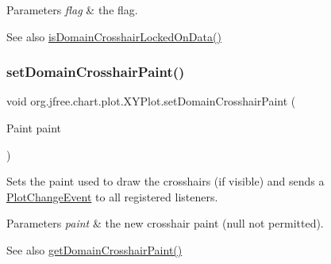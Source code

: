 \begin{DoxyParams}{Parameters}
{\em flag} & the flag.\\
\hline
\end{DoxyParams}
\begin{DoxySeeAlso}{See also}
\mbox{\hyperlink{classorg_1_1jfree_1_1chart_1_1plot_1_1_x_y_plot_adaa769a4f03f93f815c6f0be6f9d9435}{is\+Domain\+Crosshair\+Locked\+On\+Data()}} 
\end{DoxySeeAlso}
\mbox{\label{classorg_1_1jfree_1_1chart_1_1plot_1_1_x_y_plot_a7b47895577fbe1e7194037629f93b7e8}} 
\subsubsection{\texorpdfstring{set\+Domain\+Crosshair\+Paint()}{setDomainCrosshairPaint()}}
{\footnotesize\ttfamily void org.\+jfree.\+chart.\+plot.\+X\+Y\+Plot.\+set\+Domain\+Crosshair\+Paint (\begin{DoxyParamCaption}\item[{Paint}]{paint }\end{DoxyParamCaption})}

Sets the paint used to draw the crosshairs (if visible) and sends a \mbox{\hyperlink{}{Plot\+Change\+Event}} to all registered listeners.


\begin{DoxyParams}{Parameters}
{\em paint} & the new crosshair paint ({\ttfamily null} not permitted).\\
\hline
\end{DoxyParams}
\begin{DoxySeeAlso}{See also}
\mbox{\hyperlink{classorg_1_1jfree_1_1chart_1_1plot_1_1_x_y_plot_a43a34d17324643826f1b1587e73fb38a}{get\+Domain\+Crosshair\+Paint()}} 
\end{DoxySeeAlso}
\mbox{\label{classorg_1_1jfree_1_1chart_1_1plot_1_1_x_y_plot_a6807ab7e31a792322c7fc3a3d387df77}} 
